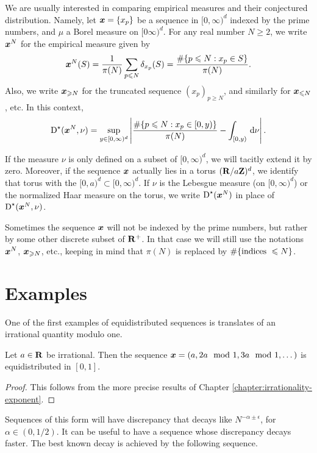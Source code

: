 We are usually interested in comparing empirical measures and their conjectured 
distribution. Namely, let ${\boldsymbol x} = \{x_p\}$ be a sequence in $[0,\infty)^d$ 
indexed by the prime numbers, and $\mu$ a Borel measure on $[0\infty)^d$. For 
any real number $N\geqslant 2$, we write ${\boldsymbol x}^N$ for the empirical measure 
given by 
\[
	{\boldsymbol x}^N(S) = \frac{1}{\pi(N)} \sum_{p\leqslant N} \delta_{x_p}(S) = \frac{\# \{p\leqslant N : x_p\in S\}}{\pi(N)} .
\]
Also, we write ${\boldsymbol x}_{\geqslant N}$ for the truncated sequence 
$(x_p)_{p\geqslant N}$, and similarly for ${\boldsymbol x}_{\leqslant N}$, etc. In this 
context, 
\[
	\operatorname{D}^\star({\boldsymbol x}^N,\nu) = \sup_{y\in [0,\infty)^d} \left| \frac{\# \{p\leqslant N : x_p \in [0,y)\}}{\pi(N)} - \int_{[0,y)} \, \mathrm{d}\nu\right| .
\]

If the measure $\nu$ is only defined on a subset of $[0,\infty)^d$, we will 
tacitly extend it by zero. Moreover, if the sequence ${\boldsymbol x}$ actually lies in a 
torus $(\mathbf{R}/a \mathbf{Z})^d$, we identify that torus with the 
$[0,a)^d\subset [0,\infty)^d$. If $\nu$ is the Lebesgue measure (on 
$[0,\infty)^d$) or the normalized Haar measure on the torus, we write 
$\operatorname{D}^\star({\boldsymbol x}^N)$ in place of $\operatorname{D}^\star({\boldsymbol x}^N, \nu)$. 

Sometimes the sequence ${\boldsymbol x}$ will not be indexed by the prime numbers, but 
rather by some other discrete subset of $\mathbf{R}^+$. In that case we will still 
use the notations ${\boldsymbol x}^N$, ${\boldsymbol x}_{\geqslant N}$, etc., keeping in mind that 
$\pi(N)$ is replaced by $\#\{\textnormal{indices }\leqslant N\}$. 





\section{Examples}

One of the first examples of equidistributed sequences is translates of an 
irrational quantity modulo one. 

\begin{theorem}
Let $a\in \mathbf{R}$ be irrational. Then the sequence 
${\boldsymbol x}=(a,2a\mod 1,3a\mod 1,\dots)$ is equidistributed in $[0,1]$. 
\end{theorem}
\begin{proof}
This follows from the more precise results of Chapter 
\ref{chapter:irrationality-exponent}. 
\end{proof}

Sequences of this form will have discrepancy that decays like 
$N^{-\alpha\pm \epsilon}$, for $\alpha\in (0,1/2)$. It can be useful to have a 
sequence whose discrepancy decays faster. The best known decay is achieved by 
the following sequence. 

